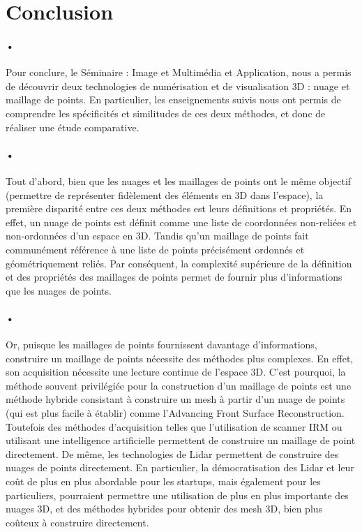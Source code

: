 \section{Conclusion}
\paragraph{•} Pour conclure, le Séminaire : Image et Multimédia et Application, nous a permis de découvrir deux technologies de numérisation et de visualisation 3D : nuage et maillage de points. En particulier, les enseignements suivis nous ont permis de comprendre les spécificités et similitudes de ces deux méthodes, et donc de réaliser une étude comparative.

\paragraph{•} Tout d'abord, bien que les nuages et les maillages de points ont le même objectif (permettre de représenter fidèlement des éléments en 3D dans l'espace), la première disparité entre ces deux méthodes est leurs définitions et propriétés. En effet, un nuage de points est définit comme une liste de coordonnées non-reliées et non-ordonnées d'un espace en 3D. Tandis qu'un maillage de points fait communément référence à une liste de points précisément ordonnés et géométriquement reliés. Par conséquent, la complexité supérieure de la définition et des propriétés des maillages de points permet de fournir plus d'informations que les nuages de points.

\paragraph{•} Or, puisque les maillages de points fournissent davantage d'informations, construire un maillage de points nécessite des méthodes plus complexes. En effet, son acquisition nécessite une lecture continue de l'espace 3D. C'est pourquoi, la méthode souvent privilégiée pour la construction d'un maillage de points est une méthode hybride consistant à construire un mesh à partir d'un nuage de points (qui est plus facile à établir) comme l'Advancing Front Surface Reconstruction. Toutefois des méthodes d'acquisition telles que l'utilisation de scanner IRM ou utilisant une intelligence artificielle permettent de construire un maillage de point directement. De même, les technologies de Lidar permettent de construire des nuages de points directement. En particulier, la démocratisation des Lidar et leur coût de plus en plus abordable pour les startups, mais également pour les particuliers, pourraient permettre une utilisation de plus en plus importante des nuages 3D, et des méthodes hybrides pour obtenir des mesh 3D, bien plus coûteux à construire directement.

